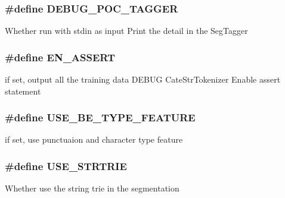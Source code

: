 \subsubsection[{DEBUG\_\-POC\_\-TAGGER}]{\setlength{\rightskip}{0pt plus 5cm}\#define DEBUG\_\-POC\_\-TAGGER}\label{cmacconfig_8h_93af837d98b085a688d02726621b5118}


Whether run with stdin as input Print the detail in the SegTagger 
\subsubsection[{EN\_\-ASSERT}]{\setlength{\rightskip}{0pt plus 5cm}\#define EN\_\-ASSERT}\label{cmacconfig_8h_126df696f0f6a8d1ec5ab4bf14b20054}


if set, output all the training data DEBUG CateStrTokenizer Enable assert statement 
\subsubsection[{USE\_\-BE\_\-TYPE\_\-FEATURE}]{\setlength{\rightskip}{0pt plus 5cm}\#define USE\_\-BE\_\-TYPE\_\-FEATURE}\label{cmacconfig_8h_435943505ae5e7a8712d51341bd05808}


if set, use punctuaion and character type feature 
\subsubsection[{USE\_\-STRTRIE}]{\setlength{\rightskip}{0pt plus 5cm}\#define USE\_\-STRTRIE}\label{cmacconfig_8h_fa0bb5c841887bf16853c4e828a8b416}


Whether use the string trie in the segmentation 